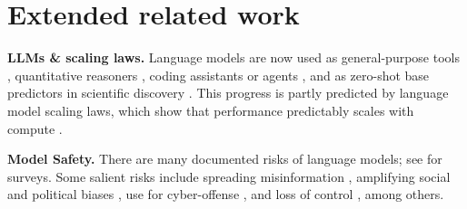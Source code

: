 \section{Extended related work}\label{app:related_work}


\textbf{LLMs \& scaling laws.} Language models are now used as general-purpose tools \citep{openai2024reasoning, anthropic2024claude3, team2024gemini}, quantitative reasoners \citep{llm-quant-reasoning, llm-lean}, coding assistants or agents \citep{nijkamp2023codegenopenlargelanguage, li2023starcodersourceyou}, and as zero-shot base predictors in scientific discovery \citep{llm-funcprotein, llm-chemtools, llm-mol}. 
This progress is partly predicted by language model scaling laws, which show that performance predictably scales with compute \citep{kaplan2020scaling, brown2020language, hoffmann2022training, wei2022emergent, pmlr-v162-borgeaud22a}. 


\textbf{Model Safety.} There are many documented risks of language models; see \citep{weidinger2021ethicalsocialrisksharm, bommasani2022opportunitiesrisksfoundationmodels, ji2024aialignmentcomprehensivesurvey, bengio2025international} for surveys. Some salient risks include spreading misinformation \citep{pmlr-v202-kandpal23a, EDTX2024}, amplifying social and political biases \cite{gallegos-etal-2024-bias, llm-bias}, use for cyber-offense \citep{ ncsc2025impact, metta2024generativeaicybersecurity}, and loss of control \citep{doi:10.1126/science.131.3410.1355, good1966speculations, 10.5555/1566174.1566226}, among others.